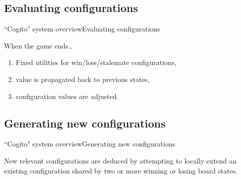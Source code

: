 



\subsection{Evaluating configurations}
\begin{frame}{``Cogito" system overview}{Evaluating configurations}

\begin{block}{When the game ends\ldots}
\begin{enumerate}
\item Fixed utilities for win/loss/stalemate configurations,
\item value is propagated back to previous states,
\item configuration values are adjusted.
\end{enumerate}
\end{block}


\end{frame}

\subsection{Generating new configurations}
\begin{frame}{``Cogito" system overview}{Generating new configurations}

New relevant configurations are deduced by attempting to locally extend an 
existing configuration shared by two or more winning or losing board states.

\end{frame}

